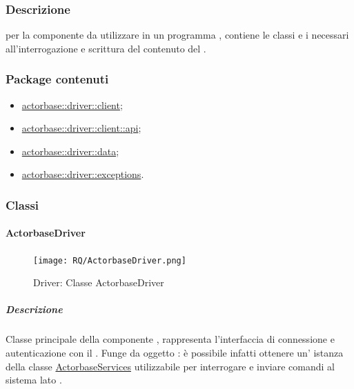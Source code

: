 \documentclass{scalatekids-article}
\begin{document}
\subsubsection{Descrizione}

 per la componente  da utilizzare in un programma
, contiene le classi e i  necessari all'interrogazione
e scrittura del contenuto del .

\subsubsection{Package contenuti}

\begin{itemize}
\item \hyperref[sec:actorbase::driver::client]{actorbase::driver::client};
\item \hyperref[sec:actorbase::driver::client::api]{actorbase::driver::client::api};
\item \hyperref[sec:actorbase::driver::data]{actorbase::driver::data};
\item \hyperref[sec:actorbase::driver::exceptions]{actorbase::driver::exceptions}.
\end{itemize}

\subsubsection{Classi}

\paragraph{ActorbaseDriver}
\label{sec:actorbase::driver::ActorbaseDriver}

\begin{figure}[H]
  \begin{center}
    \texttt{[image: RQ/ActorbaseDriver.png]}
    \caption{Driver: Classe ActorbaseDriver}
  \end{center}
\end{figure}

\subparagraph{Descrizione}

Classe principale della componente , rappresenta l'interfaccia di
connessione e autenticazione con il . Funge da oggetto
: è possibile infatti ottenere un' istanza della classe
\hyperref[sec:actorbase::driver::ActorbaseServices]{ActorbaseServices}
utilizzabile per interrogare e inviare comandi al sistema lato .
\end{document}
